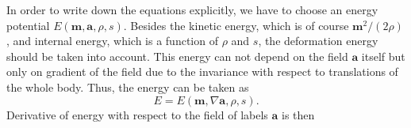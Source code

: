 \documentclass[twoside]{article}
\newcommand{\scH}{\mathscr{H}}
\newcommand{\rr}{{\boldsymbol{r}}}
\newcommand{\aaa}{{\boldsymbol{a}}}
\newcommand{\mm}{{\boldsymbol{m}}}
\newcommand{\ted}{E} %
\newcommand{\pd}{\partial}
\newcommand{\IP}[1]{ \textcolor{blue}   {\small\texttt{
\texttt{[image: pin\_small.jpeg]} Ilya: #1}} }
\newcommand{\MP}[1]{ \textcolor{Green}   {\small\texttt{
\texttt{[image: pin\_small.jpeg]} Michal: #1}} }
\newcommand{\eps}{\varepsilon}
\begin{document}
In order to write down the equations explicitly, we have to choose an energy 
potential $ \ted (\mm,\aaa,\rho,s)$. Besides the 
kinetic energy, which is of course $ \mm^2/(2\rho) $, and internal energy, 
which is a function of $ \rho $ and $ s $, the deformation energy should be 
taken into account. This energy can not depend on the field $\aaa$ itself 
but only on gradient of the field due to the invariance with respect to 
translations of the whole body. Thus, the energy can be taken as
\begin{equation}
\ted = \ted(\mm,\nabla \aaa,\rho,s).
\end{equation}
Derivative of energy with respect to the field of labels $\aaa$ is then
\end{document}
